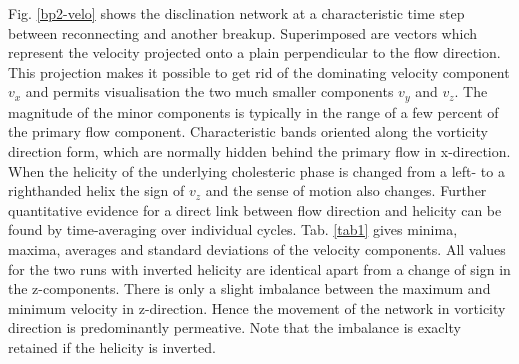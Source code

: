 \documentclass[aps,pre,reprint,superscriptaddress]{revtex4}
\begin{document}
Fig. \ref{bp2-velo} shows the disclination network at a characteristic time step between reconnecting and another breakup.
Superimposed are vectors which represent the velocity projected onto a plain perpendicular to the flow direction.
This projection makes it possible to get rid of the dominating velocity component $v_x$ and permits visualisation the 
two much smaller components $v_y$ and $v_z$.
The magnitude of the minor components is typically in the range of a few percent of the primary flow component.
Characteristic bands oriented along the vorticity direction form, which are normally hidden behind the primary flow in x-direction.
When the helicity of the underlying cholesteric phase is changed from a left- to a righthanded helix the sign of $v_z$ 
and the sense of motion also changes.
Further quantitative evidence for a direct link between flow direction and helicity can be found by time-averaging over
individual cycles.
Tab. \ref{tab1} gives minima, maxima, averages and standard deviations of the velocity components.
All values for the two runs with inverted helicity are identical apart from a change of sign in the z-components.
There is only a slight imbalance between the maximum and minimum velocity in z-direction.
Hence the movement of the network in vorticity direction is predominantly permeative.
Note that the imbalance is exaclty retained if the helicity is inverted.
\end{document}
